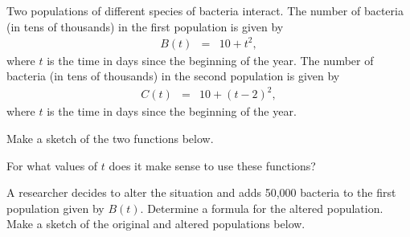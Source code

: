 
\begin{problem}
\item Two populations of different species of bacteria interact. The
  number of bacteria (in tens of thousands) in the first population is given by
  \begin{eqnarray*}
    B(t) & = & 10 + t^2,
  \end{eqnarray*}
  where $t$ is the time in days since the beginning of the year.  The
  number of bacteria (in tens of thousands) in the second population is given by
  \begin{eqnarray*}
    C(t) & = & 10+(t-2)^2,
  \end{eqnarray*}
  where $t$ is the time in days since the beginning of the year.
  \begin{subproblem}
  \item Make a sketch of the two functions below.
    \vfill
  \item For what values of $t$ does it make sense to use these functions?
    \vfill
  \item A researcher decides to alter the situation and adds 50,000
    bacteria to the first population given by $B(t)$. Determine a
    formula for the altered population. Make a sketch of the original
    and altered populations below.
    \vfill
  \end{subproblem}

\end{problem}


